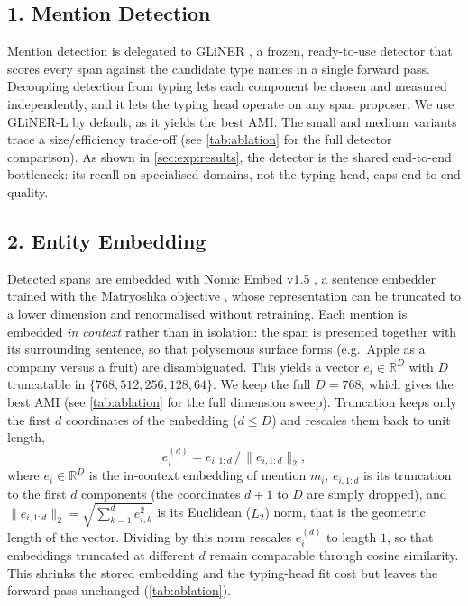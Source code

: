 

\subsection*{1. Mention Detection}
\label{sec:method:detect}
Mention detection is delegated to GLiNER \cite{zaratiana2024gliner}, a frozen, ready-to-use detector that scores every span against the candidate type names in a single forward pass.
Decoupling detection from typing lets each component be chosen and measured independently, and it lets the typing head operate on any span proposer.
We use GLiNER-L by default, as it yields the best AMI. The small and medium variants trace a size/efficiency trade-off (see \autoref{tab:ablation} for the full detector comparison).
As shown in \autoref{sec:exp:results}, the detector is the shared end-to-end bottleneck: its recall on specialised domains, not the typing head, caps end-to-end quality.

\subsection*{2. Entity Embedding}
\label{sec:method:embed}
\setcounter{paragraph}{0}
Detected spans are embedded with Nomic Embed v1.5 \cite{nussbaum2024nomic}, a sentence embedder trained with the Matryoshka objective \cite{kusupati2022matryoshka}, whose representation can be truncated to a lower dimension and renormalised without retraining.
Each mention is embedded \emph{in context} rather than in isolation: the span is presented together with its surrounding sentence, so that polysemous surface forms (e.g.\ Apple as a company versus a fruit) are disambiguated.
This yields a vector $e_i \in \mathbb{R}^{D}$ with $D$ truncatable in $\{768,512,256,128,64\}$. We keep the full $D{=}768$, which gives the best AMI (see \autoref{tab:ablation} for the full dimension sweep).
Truncation keeps only the first $d$ coordinates of the embedding ($d \le D$) and rescales them back to unit length,
\begin{equation}
e_i^{(d)} = e_{i,1:d}\,\big/\,\lVert e_{i,1:d}\rVert_2 ,
\end{equation}
where $e_i \in \mathbb{R}^{D}$ is the in-context embedding of mention $m_i$, $e_{i,1:d}$ is its truncation to the first $d$ components (the coordinates $d{+}1$ to $D$ are simply dropped), and $\lVert e_{i,1:d}\rVert_2 = \sqrt{\sum_{k=1}^{d} e_{i,k}^2}$ is its Euclidean ($L_2$) norm, that is the geometric length of the vector. Dividing by this norm rescales $e_i^{(d)}$ to length $1$, so that embeddings truncated at different $d$ remain comparable through cosine similarity. This shrinks the stored embedding and the typing-head fit cost but leaves the forward pass unchanged (\autoref{tab:ablation}).

